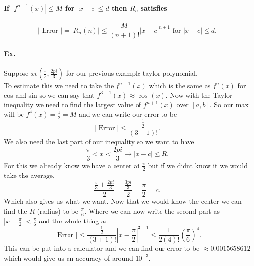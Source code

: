 \paragraph{If $ \left| f^{ n+1 }\left( x \right)  \right|\le M $ for $ \left| x-c \right|\le d $ then $ R_n $ satisfies }
\[
\left| \text{ Error } \right|= \left| R_n\left( n \right)  \right|\le \frac{ M }{ \left( n+1 \right) ! } \left| x-c \right|^{ n+1 }\text{ for } \left| x-c \right|\le d
.\] 
\paragraph{Ex.}
Suppose $ x\epsilon\left( \frac{ \pi }{ 3 } ,\frac{ 2pi }{ 3 }  \right)  $ for our previous example taylor polynomial. \\
To estimate this we need to take the $ f^{ n+1 }\left( x \right)  $ which is the same as $ f^{ n }\left( x \right)  $ for cos and sin so we can say that $ f^{ 3+1 }\left( x \right) \approx \cos^{  } \left( x \right)  $. Now with the Taylor inequality we need to find the largest value of $ f^{ n+1 }\left( x \right)  $ over $ \left[ a,b \right]  $. So our max will be $ f^{ 4 }\left( x \right) =\frac{ 1 }{ 2 } =M $ and we can write our error to be 
\[
\left| \text{ Error } \right|\le \frac{ \frac{ 1 }{ 2 }  }{ \left( 3+1 \right) ! }
.\] 
We also need the last part of our inequality so we want to have 
\[
\frac{ \pi }{ 3 } <x<\frac{ 2pi }{ 3 } \to \left| x-c \right|\le R
.\] 
For this we already know we have a center at $ \frac{ \pi }{ 2 }  $ but if we didnt know it we would take the average,
\[
\frac{ \frac{ \pi }{ 3 } +\frac{ 2pi }{ 3 }  }{ 2 }= \frac{ \frac{ 3pi }{ 3 }  }{ 2 }=\frac{ \pi }{ 2 } =c
.\] 
Which also gives us what we want. Now that we would know the center we can find the $ R $ (radius) to be $ \frac{ \pi }{ 6 }  $. Where we can now write the second part as $ \left| x-\frac{ \pi }{ 2 }  \right|<\frac{ \pi }{ 6 }  $ and the whole thing as
\[
\left| \text{ Error } \right|\le \frac{ \frac{ 1 }{ 2 }  }{ \left( 3+1 \right) ! } \left|  x-\frac{ \pi }{ 2 } \right|^{ 3+1 }\le \frac{ 1 }{ 2\left( 4 \right) ! } \left( \frac{ \pi }{ 6 }  \right) ^{ 4 }
.\] 
This can be put into a calculator and we can find our error to be $ \approx 0.0015658612 $ which would give us an accuracy of around $ 10^{ -3 } $. 
